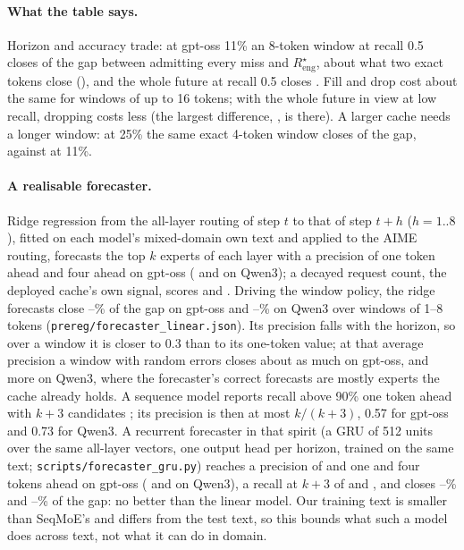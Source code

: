 \paragraph{What the table says.} Horizon and accuracy trade: at gpt-oss 11\% an 8-token window at recall 0.5 closes
\vmEightHalfLow{} of the gap between admitting every miss and $R^\star_{\mathrm{eng}}$, about what two exact tokens close (\vmShareTwoLow), and the whole future at recall 0.5
closes \vmAllHalfLow. Fill and drop cost about the same for windows of up to 16 tokens; with the whole future in view
at low recall, dropping costs less (the largest difference, \vmFillDropMax, is there). A larger
cache needs a longer window: at 25\% the same exact 4-token window closes \vmShareFourMid{} of the gap, against
\vmShareFourLow{} at 11\%.

\paragraph{A realisable forecaster.} Ridge regression from the all-layer routing of step $t$ to that of step $t{+}h$
($h{=}1..8$), fitted on each model's mixed-domain own text and applied to the AIME routing, forecasts the top $k$ experts
of each layer with a precision of \lfPrecOneGpt{} one token ahead and \lfPrecFourGpt{} four ahead on gpt-oss
(\lfPrecOneQwen{} and \lfPrecFourQwen{} on Qwen3); a decayed request count, the deployed cache's own signal, scores
\lfPrecDecOneGpt{} and \lfPrecDecFourGpt. Driving the window policy, the ridge forecasts close
\lfShareMinGpt--\lfShareMaxGpt\% of the gap on gpt-oss and \lfShareMinQwen--\lfShareMaxQwen\% on Qwen3 over windows
of 1--8 tokens (\texttt{prereg/forecaster\_linear.json}). Its precision falls with the horizon, so over a window it
is closer to 0.3 than to its one-token value; at that average precision a window with random errors closes about as much
on gpt-oss, and more on Qwen3, where the forecaster's correct forecasts are mostly experts the cache already holds. A sequence model reports recall above
90\% one token ahead with $k{+}3$ candidates \citep{wang2026seqmoe}; its precision is then at most $k/(k{+}3)$, 0.57 for
gpt-oss and 0.73 for Qwen3. A recurrent forecaster in that spirit (a GRU of 512 units over the same all-layer vectors,
one output head per horizon, trained on the same text; \texttt{scripts/forecaster\_gru.py}) reaches a precision of
\grPrecOneGpt{} and \grPrecFourGpt{} one and four tokens ahead on gpt-oss (\grPrecOneQwen{} and \grPrecFourQwen{} on
Qwen3), a recall at $k{+}3$ of \grRecThreeGpt{} and \grRecThreeQwen, and closes \grShareMinGpt--\grShareMaxGpt\% and
\grShareMinQwen--\grShareMaxQwen\% of the gap: no better than the linear model. Our training text is smaller than
SeqMoE's and differs from the test text, so this bounds what such a model does across text, not what it can do in
domain.
